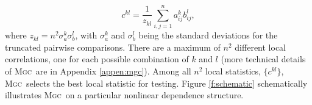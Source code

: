 \documentclass[11pt]{article}
\providecommand{\sct}[1]{{\normalfont\textsc{#1}}}
\newcommand{\G}{c}
\newcommand{\Mgc}{\sct{Mgc}}
\begin{document}
\begin{equation}
\label{localCoef}
\G^{kl}=\dfrac{1}{z_{kl}} {\textstyle \sum_{i,j=1}^n a_{ij}^k b_{ij}^l},
\end{equation}
where $z_{kl}=n^2 \sigma_a^k \sigma_b^l$,  with $\sigma_a^k$ and $\sigma_b^{l}$ being the standard deviations for the truncated pairwise comparisons. There are a maximum of $n^2$ different local correlations, one for each possible combination of $k$ and $l$ (more technical details of \Mgc~are in Appendix \ref{appen:mgc}).
Among all $n^2$ local statistics, $\{\G^{kl}\}$, \Mgc~selects the best local statistic for testing. %
Figure \ref{f:schematic} schematically illustrates \Mgc~on a particular nonlinear dependence structure.
\end{document}

